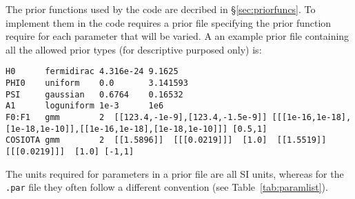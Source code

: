 The prior functions used by the code are decribed in \S\ref{sec:priorfuncs}. To implement them in the code requires a prior
file specifying the prior function require for each parameter that will be varied. A an example prior file containing all the
allowed prior types (for descriptive purposed only) is:
\begin{lstlisting}[frame=single]
H0      fermidirac 4.316e-24 9.1625
PHI0    uniform    0.0       3.141593
PSI     gaussian   0.6764    0.16532
A1      loguniform 1e-3      1e6
F0:F1   gmm        2  [[123.4,-1e-9],[123.4,-1.5e-9]] [[[1e-16,1e-18],[1e-18,1e-10]],[[1e-16,1e-18],[1e-18,1e-10]]] [0.5,1]
COSIOTA gmm        2  [[1.5896]]  [[[0.0219]]]  [1.0]  [[1.5519]]  [[[0.0219]]]  [1.0] [-1,1]
\end{lstlisting}
The units required for parameters in a prior file are all SI units, whereas for the {\tt .par} file they often follow a different
convention (see Table~\ref{tab:paramlist}).

